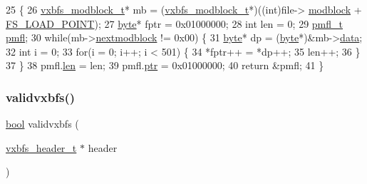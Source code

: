 \begin{DoxyCode}
25                                      \{
26     \hyperlink{a00336}{vxbfs\_modblock\_t}* mb = (\hyperlink{a00336}{vxbfs\_modblock\_t}*)((\textcolor{keywordtype}{int})file->
      \hyperlink{a00340_a56503c715b4121591ca7367c9cbd7093_a56503c715b4121591ca7367c9cbd7093}{modblock} + \hyperlink{a00134_ade5f4f9306a7cacc0cb2a518bd97e237_ade5f4f9306a7cacc0cb2a518bd97e237}{FS\_LOAD\_POINT});
27     \hyperlink{a00140_ab8ef12fab634c171394422d0ee8baf94_ab8ef12fab634c171394422d0ee8baf94}{byte}* fptr = 0x01000000;
28     \textcolor{keywordtype}{int} len = 0;
29     \hyperlink{a00320}{pmfl\_t} \hyperlink{a00320}{pmfl};
30     \textcolor{keywordflow}{while}(mb->\hyperlink{a00336_afbf261c73a36b4d33e8a8b5179d4385b_afbf261c73a36b4d33e8a8b5179d4385b}{nextmodblock} != 0x00) \{
31         \hyperlink{a00140_ab8ef12fab634c171394422d0ee8baf94_ab8ef12fab634c171394422d0ee8baf94}{byte}* dp = (\hyperlink{a00140_ab8ef12fab634c171394422d0ee8baf94_ab8ef12fab634c171394422d0ee8baf94}{byte}*)&mb->\hyperlink{a00336_a327348a3ea3a02cfde4cdb1ccdcf2073_a327348a3ea3a02cfde4cdb1ccdcf2073}{data};
32         \textcolor{keywordtype}{int} i = 0;
33         \textcolor{keywordflow}{for}(i = 0; i++; i < 501) \{
34             *fptr++ = *dp++;
35             len++;
36         \}
37     \}
38     pmfl.\hyperlink{a00320_a151dcc6387f9c9186b4b84526c3a89ff_a151dcc6387f9c9186b4b84526c3a89ff}{len} = len;
39     pmfl.\hyperlink{a00320_a150c011a31f99dbd408f8650f3fa1089_a150c011a31f99dbd408f8650f3fa1089}{ptr} = 0x01000000;
40     \textcolor{keywordflow}{return} &pmfl;
41 \}
\end{DoxyCode}
\mbox{\label{a00203_a078a66e7d52fd4a6df768277b605199c_a078a66e7d52fd4a6df768277b605199c}} 
\subsubsection{\texorpdfstring{validvxbfs()}{validvxbfs()}}
{\footnotesize\ttfamily \hyperlink{a00140_af6a258d8f3ee5206d682d799316314b1_af6a258d8f3ee5206d682d799316314b1}{bool} validvxbfs (\begin{DoxyParamCaption}\item[{\hyperlink{a00206_ac5678b6d5dd5ed5ca86e5ccd4c30d39d_ac5678b6d5dd5ed5ca86e5ccd4c30d39d}{vxbfs\+\_\+header\+\_\+t} $\ast$}]{header }\end{DoxyParamCaption})}



